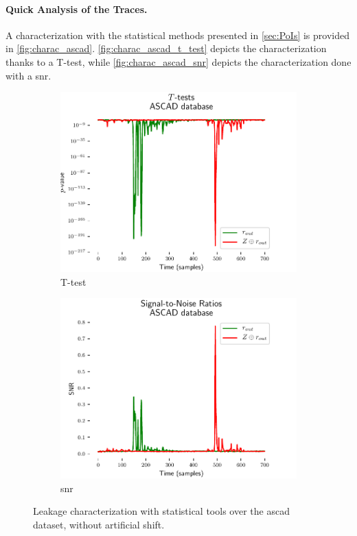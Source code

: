 \paragraph{Quick Analysis of the Traces.}
A characterization with the statistical methods presented in \autoref{sec:PoIs} is provided in \autoref{fig:charac_ascad}.
\autoref{fig:charac_ascad_t_test} depicts the characterization thanks to a T-test, while \autoref{fig:charac_ascad_snr} depicts the characterization done with a \gls{snr}.
\begin{figure}
    \centering
    \begin{subfigure}{0.49 \textwidth}
        \includegraphics[width=\textwidth]{ASCAD/ttest_m_and_zxm}
        \caption{T-test}
        \label{fig:charac_ascad_t_test}
    \end{subfigure}
    \begin{subfigure}{0.49 \textwidth}
        \includegraphics[width=\textwidth]{ASCAD/snr_m_and_zxm}
        \caption{\gls{snr}}
        \label{fig:charac_ascad_snr}
    \end{subfigure}
    \caption{Leakage characterization with statistical tools over the \gls{ascad} dataset, without artificial shift.}
    \label{fig:charac_ascad}
\end{figure}
